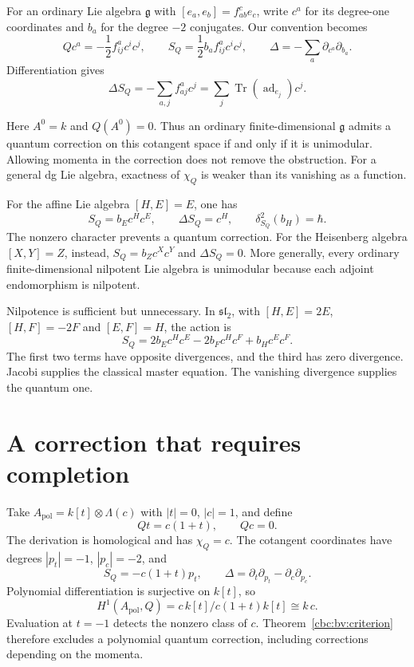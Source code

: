 For an ordinary Lie algebra $\mathfrak g$ with
$[e_a,e_b]=f^c_{ab}e_c$, write $c^a$ for its degree-one coordinates
and $b_a$ for the degree $-2$ conjugates.  Our convention becomes
\begin{equation}\label{cbc:bv:ordinary}
 Qc^a=-\frac12f^a_{ij}c^ic^j,\qquad
 S_Q=\frac12b_a f^a_{ij}c^ic^j,\qquad
 \Delta=-\sum_a\partial_{c^a}\partial_{b_a}.
\end{equation}
Differentiation gives
\[
 \Delta S_Q=-\sum_{a,j}f^a_{aj}c^j
          =\sum_j\operatorname{Tr}(\operatorname{ad}_{e_j})c^j.
\]

Here $A^0=k$ and $Q(A^0)=0$.
Thus an ordinary finite-dimensional $\mathfrak g$ admits a quantum
correction on this cotangent space if and only if it is unimodular.
Allowing momenta in the correction does not remove the obstruction.
For a general dg Lie algebra, exactness of $\chi_Q$ is weaker than
its vanishing as a function.

For the affine Lie algebra $[H,E]=E$, one has
\[
 S_Q=b_Ec^Hc^E,\qquad \Delta S_Q=c^H,\qquad
 \delta_{S_Q}^2(b_H)=\hbar.
\]
The nonzero character prevents a quantum correction.
For the Heisenberg algebra $[X,Y]=Z$, instead,
$S_Q=b_Zc^Xc^Y$ and $\Delta S_Q=0$.
More generally, every ordinary finite-dimensional nilpotent Lie
algebra is unimodular because each adjoint endomorphism is nilpotent.

Nilpotence is sufficient but unnecessary.  In $\mathfrak{sl}_2$,
with $[H,E]=2E$, $[H,F]=-2F$ and $[E,F]=H$, the action is
\[
 S_Q=2b_Ec^Hc^E-2b_Fc^Hc^F+b_Hc^Ec^F.
\]
The first two terms have opposite divergences, and the third has
zero divergence.  Jacobi supplies the classical master equation.
The vanishing divergence supplies the quantum one.

\section{A correction that requires completion}
Take $A_{\mathrm{pol}}=k[t]\otimes\Lambda(c)$ with $|t|=0$,
$|c|=1$, and define
\[
 Qt=c(1+t),\qquad Qc=0.
\]
The derivation is homological and has $\chi_Q=c$.
The cotangent coordinates have degrees $|p_t|=-1$, $|p_c|=-2$, and
\[
 S_Q=-c(1+t)p_t,\qquad
 \Delta=\partial_t\partial_{p_t}-\partial_c\partial_{p_c}.
\]
Polynomial differentiation is surjective on $k[t]$, so
\[
 H^1(A_{\mathrm{pol}},Q)
 =c\,k[t]\big/c(1+t)k[t]\cong k\,c .
\]
Evaluation at $t=-1$ detects the nonzero class of $c$.
Theorem~\ref{cbc:bv:criterion} therefore excludes a polynomial
quantum correction, including corrections depending on the momenta.

